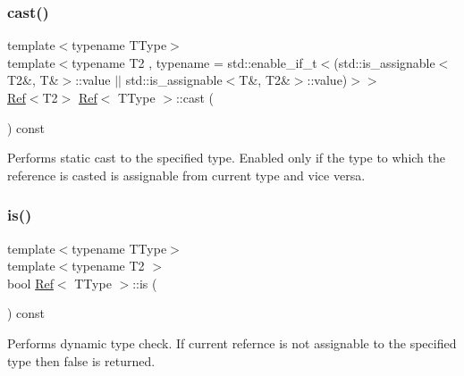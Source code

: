 \mbox{\label{class_ref_a616580cb90ccb7611dcc3b2c1d15130d}} 
\subsubsection{\texorpdfstring{cast()}{cast()}}
{\footnotesize\ttfamily template$<$typename T\+Type$>$ \\
template$<$typename T2 , typename  = std\+::enable\+\_\+if\+\_\+t$<$(std\+::is\+\_\+assignable$<$\+T2\&, T\&$>$\+::value $\vert$$\vert$ std\+::is\+\_\+assignable$<$\+T\&, T2\&$>$\+::value)$>$$>$ \\
\mbox{\hyperlink{class_ref}{Ref}}$<$T2$>$ \mbox{\hyperlink{class_ref}{Ref}}$<$ T\+Type $>$\+::cast (\begin{DoxyParamCaption}{ }\end{DoxyParamCaption}) const\hspace{0.3cm}{\ttfamily [inline]}}



Performs static cast to the specified type. Enabled only if the type to which the reference is casted is assignable from current type and vice versa. 

\mbox{\label{class_ref_a1f1c08e3689380efc4471e109dafce28}} 
\subsubsection{\texorpdfstring{is()}{is()}}
{\footnotesize\ttfamily template$<$typename T\+Type$>$ \\
template$<$typename T2 $>$ \\
bool \mbox{\hyperlink{class_ref}{Ref}}$<$ T\+Type $>$\+::is (\begin{DoxyParamCaption}{ }\end{DoxyParamCaption}) const\hspace{0.3cm}{\ttfamily [inline]}}



Performs dynamic type check. If current refernce is not assignable to the specified type then false is returned. 

\mbox{\label{class_ref_a1feffacefd6a3f6e42a362e0669264ee}} 
